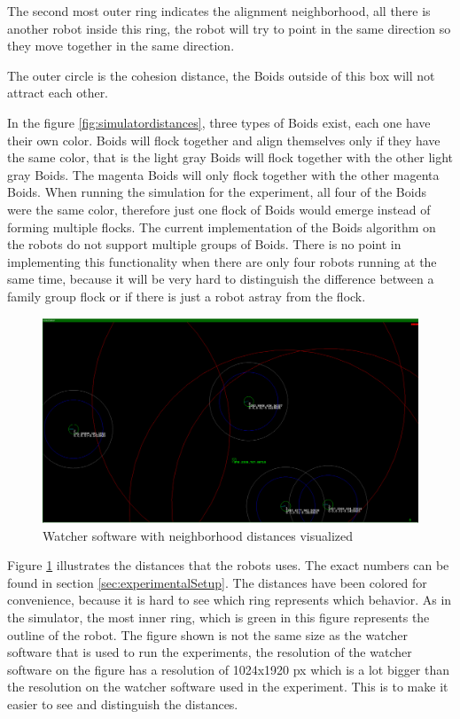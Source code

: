 The second most outer ring indicates the alignment neighborhood, all there is another robot inside this ring, the robot will try to point in the same direction so they move together in the same direction.

The outer circle is the cohesion distance, the Boids outside of this box will not attract each other.


In the figure \ref{fig:simulatordistances}, three types of Boids exist, each one have their own color. Boids will flock together and align themselves only if they have the same color, that is the light gray Boids will flock together with the other light gray Boids. The magenta Boids will only flock together with the other magenta Boids.
When running the simulation for the experiment, all four of the Boids were the same color, therefore just one flock of Boids would emerge instead of forming multiple flocks. The current implementation of the Boids algorithm on the robots do not support multiple groups of Boids. There is no point in implementing this functionality when there are only four robots running at the same time, because it will be very hard to distinguish the difference between a family group flock or if there is just a robot astray from the flock.

\begin{figure}[h]
\begin{center}
\includegraphics[width=1.1\linewidth]{figs/wathcer}
\end{center}
\caption[Watcher software]{Watcher software with neighborhood distances visualized}
\label{fig:watcher}
\end{figure}

Figure \ref{fig:watcher} illustrates the distances that the robots uses. The exact numbers can be found in section \ref{sec:experimentalSetup}. The distances have been colored for convenience, because it is hard to see which ring represents which behavior. As in the simulator, the most inner ring, which is green in this figure represents the outline of the robot. The figure shown is not the same size as the watcher software that is used to run the experiments, the resolution of the watcher software on the figure has a resolution of 1024x1920 px which is a lot bigger than the resolution on the watcher software used in the experiment. This is to make it easier to see and distinguish the distances.

